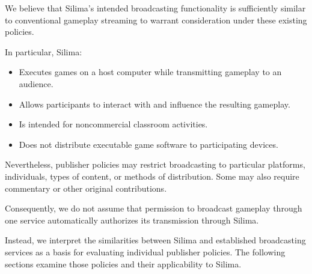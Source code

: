 We believe that Silima's intended broadcasting
functionality is sufficiently similar to conventional
gameplay streaming to warrant consideration under
these existing policies.

In particular, Silima:
\begin{itemize}
    \item Executes games on a host computer while
          transmitting gameplay to an audience.
    \item Allows participants to interact with and
          influence the resulting gameplay.
    \item Is intended for noncommercial classroom
          activities.
    \item Does not distribute executable game
          software to participating devices.
\end{itemize}

Nevertheless, publisher policies may restrict
broadcasting to particular platforms, individuals,
types of content, or methods of distribution.
Some may also require commentary or other
original contributions.

Consequently, we do not assume that permission
to broadcast gameplay through one service
automatically authorizes its transmission
through Silima.

Instead, we interpret the similarities between
Silima and established broadcasting services as
a basis for evaluating individual publisher
policies. The following sections examine those
policies and their applicability to Silima.
